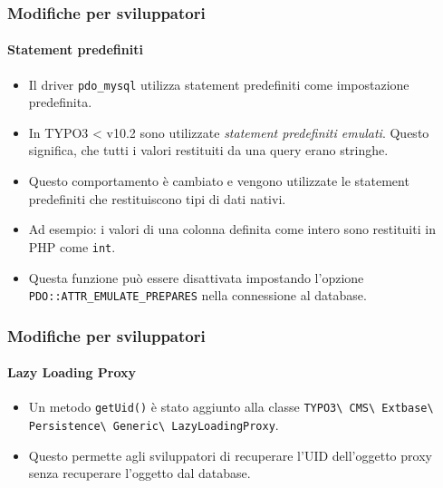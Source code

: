 \begin{frame}[fragile]
	\frametitle{Modifiche per sviluppatori}
	\framesubtitle{Statement predefiniti}

	\lstset{basicstyle=\tiny\ttfamily}

	\begin{itemize}
		\item Il driver \texttt{pdo\_mysql} utilizza statement predefiniti come impostazione predefinita.
		\item In TYPO3 < v10.2 sono utilizzate \textit{statement predefiniti emulati}.
			Questo significa, che tutti i valori restituiti da una query erano stringhe.
		\item Questo comportamento è cambiato e vengono utilizzate le statement predefiniti
			che restituiscono tipi di dati nativi.
		\item Ad esempio: i valori di una colonna definita come intero sono restituiti in PHP come \texttt{int}.
		\item Questa funzione può essere disattivata impostando l'opzione
			\texttt{PDO::ATTR\_EMULATE\_PREPARES} nella connessione al database.

	\end{itemize}

\end{frame}


\begin{frame}[fragile]
	\frametitle{Modifiche per sviluppatori}
	\framesubtitle{Lazy Loading Proxy}

	\lstset{basicstyle=\tiny\ttfamily}

	\begin{itemize}
		\item Un metodo \texttt{getUid()} è stato aggiunto alla classe\newline
			\texttt{TYPO3\textbackslash
				CMS\textbackslash
				Extbase\textbackslash
				Persistence\textbackslash
				Generic\textbackslash
				LazyLoadingProxy}.
		\item Questo permette agli sviluppatori di recuperare l'UID dell'oggetto proxy senza recuperare l'oggetto dal database.

	\end{itemize}

\end{frame}

